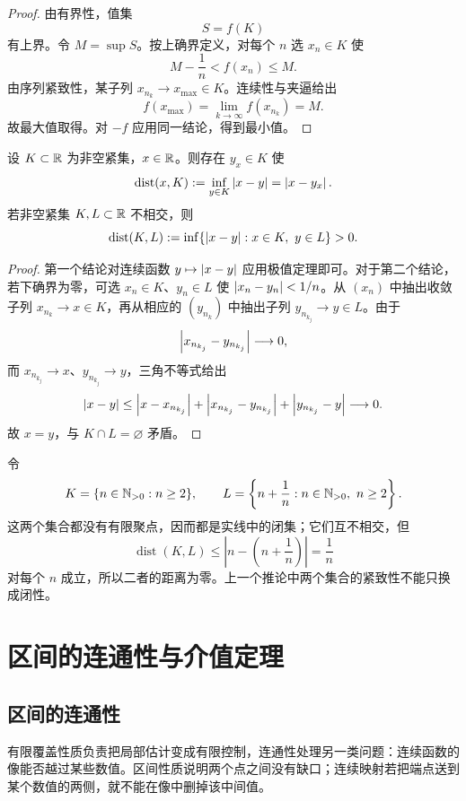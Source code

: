 \begin{proof}
由有界性，值集
\[
 S=f(K)
\]
有上界。令 \(M=\sup S\)。按上确界定义，对每个 \(n\) 选 \(x_n\in K\) 使
\[
 M-\frac1n<f(x_n)\le M.
\]
由序列紧致性，某子列 \(x_{n_k}\to x_{\max}\in K\)。连续性与夹逼给出
\[
 f(x_{\max})
 =\lim_{k\to\infty}f(x_{n_k})
 =M.
\]
故最大值取得。对 \(-f\) 应用同一结论，得到最小值。
\end{proof}

\begin{corollary}[到紧集的距离]
设 \(K\subset\mathbb{R}\) 为非空紧集，\(x\in\mathbb{R}\)。则存在 \(y_x\in K\) 使
\[
 \operatorname{dist}(x,K)
 :=\inf_{y\in K}\left|x-y\right|
 =\left|x-y_x\right|.
\]
若非空紧集 \(K,L\subset\mathbb{R}\) 不相交，则
\[
 \operatorname{dist}(K,L)
 :=\inf\{\left|x-y\right|:x\in K,\ y\in L\}>0.
\]
\end{corollary}

\begin{proof}
第一个结论对连续函数 \(y\mapsto\left|x-y\right|\) 应用极值定理即可。对于第二个结论，若下确界为零，可选
\(x_n\in K\)、\(y_n\in L\) 使 \(\left|x_n-y_n\right|<1/n\)。从 \((x_n)\) 中抽出收敛子列 \(x_{n_k}\to x\in K\)，再从相应的 \((y_{n_k})\) 中抽出子列 \(y_{n_{k_j}}\to y\in L\)。由于
\[
 \left|x_{n_{k_j}}-y_{n_{k_j}}\right|\longrightarrow0,
\]
而 \(x_{n_{k_j}}\to x\)、\(y_{n_{k_j}}\to y\)，三角不等式给出
\[
 \left|x-y\right|
 \le \left|x-x_{n_{k_j}}\right|
   +\left|x_{n_{k_j}}-y_{n_{k_j}}\right|
   +\left|y_{n_{k_j}}-y\right|\longrightarrow0.
\]
故 \(x=y\)，与 \(K\cap L=\varnothing\) 矛盾。
\end{proof}

\begin{counterexample}[不相交闭集之间的距离可以为零]
令
\[
 K=\{n\in\mathbb{N}_{>0}:n\ge2\},\qquad
 L=\left\{n+\frac1n:n\in\mathbb{N}_{>0},\ n\ge2\right\}.
\]
这两个集合都没有有限聚点，因而都是实线中的闭集；它们互不相交，但
\[
 \operatorname{dist}(K,L)
 \le \left|n-\left(n+\frac1n\right)\right|
 =\frac1n
\]
对每个 \(n\) 成立，所以二者的距离为零。上一个推论中两个集合的紧致性不能只换成闭性。
\end{counterexample}

\section{区间的连通性与介值定理}

\subsection{区间的连通性}

有限覆盖性质负责把局部估计变成有限控制，连通性处理另一类问题：连续函数的像能否越过某些数值。区间性质说明两个点之间没有缺口；连续映射若把端点送到某个数值的两侧，就不能在像中删掉该中间值。

